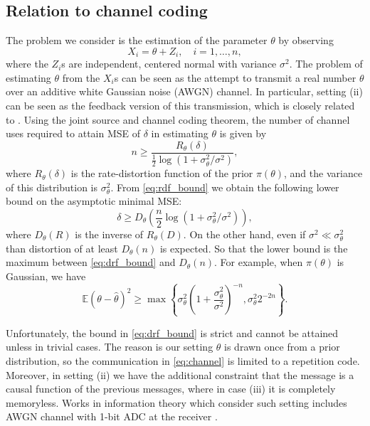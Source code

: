 \documentclass[letterpaper, conference]{IEEEtran}      %
\begin{document}
\subsection*{Relation to channel coding}
The problem we consider is the estimation of the parameter $\theta$ by observing 
\begin{equation}
\label{eq:channel}
X_i = \theta + Z_i, \quad i=1,\ldots,n,
\end{equation}
where the $Z_i$s are independent, centered normal with variance $\sigma^2$. The problem of estimating $\theta$ from the $X_i$s can be seen as the attempt to transmit a real number $\theta$ over an additive white Gaussian noise (AWGN) channel. In particular, setting (ii) can be seen as the feedback version of this transmission, which is closely related to \cite{horstein1963sequential, 1053879}. Using the joint source and channel coding theorem, the number of channel uses required to attain MSE of $\delta$ in estimating $\theta$ is given by
\begin{equation} \label{eq:rdf_bound}
n \geq \frac{R_\theta(\delta)}{ \frac{1}{2} \log\left( 1+ \sigma_\theta^2/\sigma^2 \right)},
\end{equation}
where $R_\theta(\delta)$ is the rate-distortion function of the prior $\pi(\theta)$, and the variance of this distribution is $\sigma_\theta^2$. From \eqref{eq:rdf_bound} we obtain the following lower bound on the asymptotic minimal MSE:
\begin{equation} \label{eq:drf_bound}
\delta \geq D_\theta \left(\frac{n}{2} \log \left( 1+ \sigma_\theta^2 / \sigma^2 \right)  \right),
\end{equation}
where $D_\theta(R)$ is the inverse of $R_\theta(D)$. On the other hand, even if $\sigma^2 \ll \sigma_\theta^2$ than distortion of at least $D_\theta(n)$ is expected. So that the lower bound is the maximum between \eqref{eq:drf_bound} and $D_\theta(n)$. For example, when $\pi(\theta)$ is Gaussian, we have 
\[
\mathbb E \left(\theta - \widehat{\theta}\right)^2 \geq \max \left\{  \sigma_\theta^2 \left(1+\frac{\sigma_\theta^2}{\sigma^2} \right)^{-n} , \sigma_\theta^2 2^{-2n} \right\}. 
\]


Unfortunately, the bound in \eqref{eq:drf_bound} is strict and cannot be attained unless in trivial cases. The reason is our setting $\theta$ is drawn once from a prior distribution, so the communication in \eqref{eq:channel} is limited to a repetition code. Moreover, in setting (ii) we have the additional constraint that the message is a causal function of the previous messages, where in case (iii) it is completely memoryless. Works in information theory which consider such setting includes AWGN channel with 1-bit ADC at the receiver \cite{DBLP:journals/corr/VarastehSG16}. \par
\end{document}
